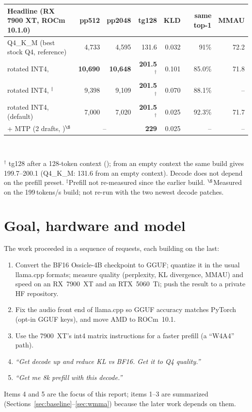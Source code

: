 \documentclass[10pt,a4paper]{article}
\newcommand{\tx}[1]{\texttt{\detokenize{#1}}}
\begin{document}
\vspace{4pt}
\begin{center}
\small
\begin{tabular}{@{}lrrrrrr@{}}
\toprule
\textbf{Headline (RX 7900 XT, ROCm 10.1.0)} & pp512 & pp2048 & tg128 & KLD & same top-1 & MMAU\\
\midrule
Q4\_K\_M (best stock Q4, reference) & 4{,}733 & 4{,}595 & 131.6 & 0.032 & 91\% & 72.2\\
rotated INT4, \tx{fast} & \textbf{10{,}690} & \textbf{10{,}648} & \textbf{201.5}$^{\dagger}$ & 0.101 & 85.0\% & 71.8\\
rotated INT4, \tx{balanced}$^{\ddagger}$ & 9{,}398 & 9{,}109 & \textbf{201.5}$^{\dagger}$ & 0.070 & 88.1\% & --\\
rotated INT4, \tx{quality} (default) & 7{,}000 & 7{,}020 & \textbf{201.5}$^{\dagger}$ & 0.025 & 92.3\% & 71.7\\
\midrule
\tx{quality} + MTP (2 drafts, \tx{llama-server})$^{\S}$ & \multicolumn{2}{c}{--} & \textbf{229} & 0.025 & -- & --\\
\bottomrule
\end{tabular}\\[3pt]
\parbox{.92\linewidth}{\scriptsize $^{\dagger}$\tx{llama-bench} tg128 after a 128-token context (\tx{-d 128}); from an empty context the same build gives 199.7--200.1 (Q4\_K\_M: 131.6
from an empty context). Decode does not depend on the prefill preset. $^{\ddagger}$Prefill not re-measured since the earlier build. $^{\S}$Measured on the 199\,tokens/s build;
not re-run with the two newest decode patches.}
\end{center}

\tableofcontents
\newpage

\section{Goal, hardware and model}
\label{sec:goal}

The work proceeded in a sequence of requests, each building on the last:
\begin{enumerate}
\item Convert the BF16 Ossicle-4B checkpoint to GGUF; quantize it in the usual llama.cpp formats; measure quality (perplexity,
      KL divergence, MMAU) and speed on an RX~7900~XT and an RTX~5060~Ti; push the result to a private HF repository.
\item Fix the audio front end of llama.cpp so GGUF accuracy matches PyTorch (opt-in GGUF keys), and move AMD to ROCm~10.1.
\item Use the 7900~XT's int4 matrix instructions for a faster prefill (a ``W4A4'' path).
\item \emph{``Get decode up and reduce KL vs BF16. Get it to Q4 quality.''}
\item \emph{``Get me 8k prefill with this decode.''}
\end{enumerate}
Items 4 and 5 are the focus of this report; items 1--3 are summarized (Sections~\ref{sec:baseline}--\ref{sec:wmma}) because
the later work depends on them.
\end{document}
